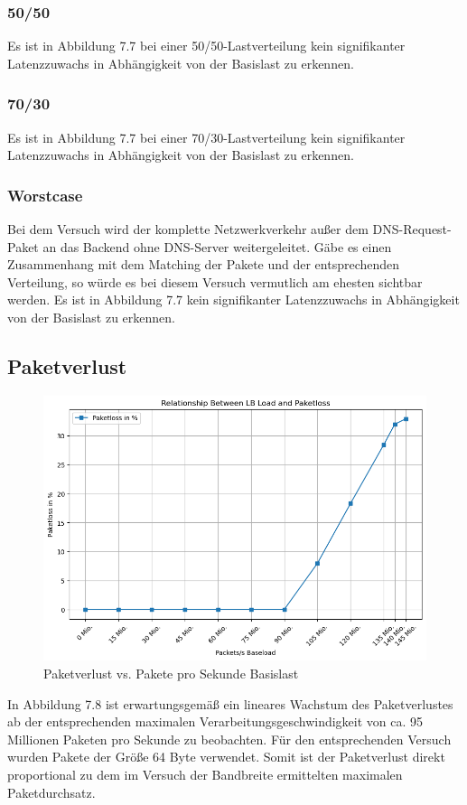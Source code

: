 \subsubsection{50/50}

Es ist in Abbildung 7.7 bei einer 50/50-Lastverteilung kein signifikanter Latenzzuwachs in Abhängigkeit von der Basislast zu erkennen.
\subsubsection{70/30}

Es ist in Abbildung 7.7 bei einer 70/30-Lastverteilung kein signifikanter Latenzzuwachs in Abhängigkeit von der Basislast zu erkennen.
\subsubsection{Worstcase}
Bei dem Versuch wird der komplette Netzwerkverkehr außer dem DNS-Request-Paket an das Backend ohne DNS-Server weitergeleitet. Gäbe es einen Zusammenhang mit dem Matching der Pakete und der entsprechenden Verteilung, so würde es bei diesem Versuch vermutlich am ehesten sichtbar werden.
Es ist in Abbildung 7.7 kein signifikanter Latenzzuwachs in Abhängigkeit von der Basislast zu erkennen.
\subsection{Paketverlust}
\begin{figure}
    \centering
    \includegraphics[width=0.95\linewidth]{images/packetloss.png}
    \caption{Paketverlust vs. Pakete pro Sekunde Basislast}
    \label{fig:enter-label}
\end{figure}
In Abbildung 7.8 ist erwartungsgemäß ein lineares Wachstum des Paketverlustes ab der entsprechenden maximalen Verarbeitungsgeschwindigkeit von ca. 95 Millionen Paketen pro Sekunde zu beobachten. Für den entsprechenden Versuch wurden Pakete der Größe 64 Byte verwendet. Somit ist der Paketverlust direkt proportional zu dem im  Versuch der Bandbreite ermittelten maximalen Paketdurchsatz.